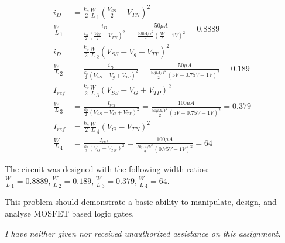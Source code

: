 \documentclass[12pt,letterpaper,titlepage]{article}
\begin{document}
\begin{raggedright}
\begin{align*}
   i_D
   &= \frac{k_n}{2}\frac{W}{L}_1(\frac{V_{SS}}{2} - V_{TN})^2
\\ \frac{W}{L}_1
   &= \frac{i_D}{\frac{k_n}{2}(\frac{V_{SS}}{2} - V_{TN})^2}
    = \frac{50\mu A}{\frac{50\mu A/V^2}{2}(\frac{5V}{2} - 1V)^2}
    = 0.8889
\\ i_D
   &= \frac{k_p}{2}\frac{W}{L}_2(V_{SS} - V_g + V_{TP})^2
\\ \frac{W}{L}_2
   &= \frac{i_D}{\frac{k_p}{2}(V_{SS} - V_g + V_{TP})^2}
    = \frac{50\mu A}{\frac{50\mu A/V^2}{2}(5V - 0.75V - 1V)^2}
    = 0.189
\\ I_{ref}
   &= \frac{k_p}{2}\frac{W}{L}_3 (V_{SS} - V_G + V_{TP})^2
\\ \frac{W}{L}_3
   &= \frac{I_{ref}}{\frac{k_p}{2}(V_{SS} - V_G + V_{TP})^2}
 	= \frac{100\mu A}{\frac{50\mu A/V^2}{2}(5V - 0.75V - 1V)^2}
	= 0.379
\\ I_{ref}
   &= \frac{k_n}{2}\frac{W}{L}_4 (V_G - V_{TN})^2
\\ \frac{W}{L}_4
   &= \frac{I_{ref}}{\frac{k_n}{2}(V_G - V_{TN})^2}
	= \frac{100\mu A}{\frac{50\mu A/V^2}{2}(0.75V - 1V)^2}
	= 64
\end{align*}

The circuit was designed with the following width ratios: $\frac{W}{L}_1 = 0.8889, \frac{W}{L}_2 = 0.189, \frac{W}{L}_3 = 0.379, \frac{W}{L}_4 = 64$.

This problem should demonstrate a basic ability to manipulate, design, and analyse MOSFET based logic gates. 

\textit{I have neither given nor received unauthorized assistance on this assignment.}


\end{raggedright}
\end{document}
